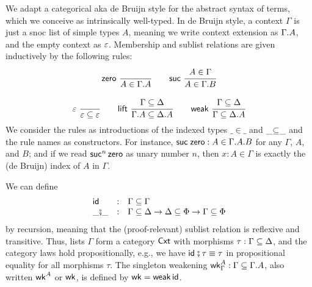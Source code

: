 \documentclass[sigconf,screen,fleqn]{acmart} %
\begin{document}
We adapt a categorical aka de Bruijn style for the abstract syntax of
terms, which we conceive as intrinsically well-typed.  In de Bruijn
style, a context $\Gamma$ is just a snoc list of simple types $A$,
meaning we write context extension as $\Gamma.A$, and the empty
context as $\varepsilon$.  Membership  and sublist
relations \fbox{$\Gamma \sublist \Delta$} are given inductively by the
following rules:
\begin{gather*}
  \nru{\tzero}{}{A \in \cext \Gamma A}
\qquad
  \nru{\tsuc}{A \in \Gamma}{A \in \cext \Gamma B}
\\[2ex]
  \nru{\tdone}{}{\cempty \sublist \cempty}
\qquad
  \nru{\tlift}
    {\Gamma \sublist \Delta}
    {\cext \Gamma A \sublist \cext \Delta A}
\qquad
  \nru{\tweak}
    {\Gamma \sublist \Delta}
    {\Gamma \sublist \cext \Delta A}
\end{gather*}
We consider the rules as introductions of the indexed types
$\_{\in}\_$ and $\_{\subseteq}\_$ and the rule names as constructors.
For instance, $\mathsf{\mathsf{suc}\;\mathsf{zero}} : A \in \Gamma.A.B$ for any
$\Gamma$, $A$, and $B$; and if we read $\mathsf{suc}^n\,\mathsf{zero}$ as unary
number $n$, then $x : A \in \Gamma$ is exactly the (de Bruijn) index
of $A$ in $\Gamma$.

We can define
\[
\begin{array}{lcl}
\mathsf{id} & : & \Gamma \subseteq \Gamma
\\
\_{\fatsemi}\_ & : & \Gamma
\subseteq \Delta \to \Delta \subseteq \Phi \to \Gamma \subseteq \Phi
\end{array}
\]
by recursion, meaning that the (proof-relevant)
sublist relation is reflexive and transitive.
Thus, lists $\Gamma$ form a category
$\mathsf{Cxt}$ with morphisms $\tau : \Gamma \subseteq \Delta$, and the category laws
hold propositionally, e.g., we have $\mathsf{id}_{} \fatsemi \tau \equiv \tau$ in
propositional equality for all morphisms $\tau$.
The singleton weakening $\mathsf{wk}^A_\Gamma : \Gamma \subseteq \Gamma.A$,
also written $\mathsf{wk}^A$ or $\mathsf{wk}$, is defined by $\mathsf{wk} = \mathsf{weak}\,\mathsf{id}$.
\end{document}
